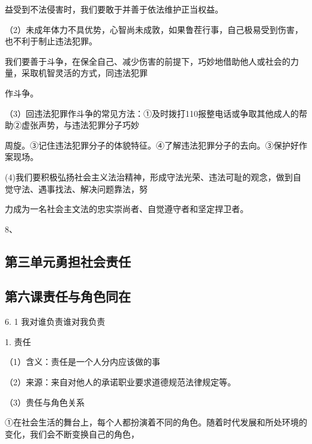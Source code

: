 \documentclass[lang=cn,11pt]{elegantbook}
\newcommand{\daofasym}[1]{{\daofasymbolfont #1}}
\newcommand{\daofasym}[1]{#1}
\begin{document}
益受到不法侵害时，我们要敢于并善于依法维护正当权益。\par

（2）未成年体力不具优势，心智尚未成敦，如果鲁茬行事，自己极易受到伤害，也不利于制止违法犯罪。\par

我们要善于斗争，在保全自己、减少伤害的前提下，巧妙地借助他人或社会的力量，采取机智灵活的方式，同违法犯罪\par

作斗争。\par

（3）回违法犯罪作斗争的常见方法：\daofasym{①}及时拨打110报整电话或争取其他成人的帮助\daofasym{②}虚张声势，与违法犯罪分子巧妙\par

周旋。\daofasym{③}记住违法犯罪分子的体貌特征。\daofasym{④}了解违法犯罪分子的去向。\daofasym{③}保护好作案现场。\par

(4)我们要积极弘扬社会主义法治精神，形成守法光荣、违法可耻的观念，做到自觉守法、遇事找法、解决问题靠法，努\par

力成为一名社会主文法的忠实崇尚者、自觉遵守者和坚定捍卫者。\par

8、\par

\subsection*{第三单元勇担社会责任}

\subsection*{第六课责任与角色同在}

6. 1 我对谁负责谁对我负责\par

1. 责任\par

（1）含义：责任是一个人分内应该做的事\par

（2）来源：来自对他人的承诺职业要求道德规范法律规定等。\par

（3）贵任与角色关系\par

\daofasym{①}在社会生活的舞台上，每个人都扮演着不同的角色。随着时代发展和所处环境的变化，我们会不断变换自己的角色，\par
\end{document}

